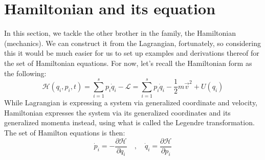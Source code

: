 \section{Hamiltonian and its equation}
In this section, we tackle the other brother in the family, the Hamiltonian (mechanics). We can construct it from the Lagrangian, fortunately, so considering this it would be much easier for us to set up examples and derivations thereof for the set of Hamiltonian equations. For now, let's recall the Hamiltonian form as the following: 
\begin{equation}
    \mathcal{H}(q_{i},p_{i},t) = \sum_{i=1}^{s}p_{i}\dot{q}_{i} - \mathcal{L} = \sum_{i=1}^{s}p_{i}\dot{q}_{i} - \frac{1}{2}m\vec{v}^{2} + U(q_{i})
\end{equation}
While Lagrangian is expressing a system via generalized coordinate and velocity, Hamiltonian expresses the system via its generalized coordinates and its generalized momenta instead, using what is called the Legendre transformation. The set of Hamilton equations is then: 
\begin{equation}
    \dot{p}_{i} = - \frac{\partial \mathcal{H}}{\partial q_{i}}\quad , \quad \dot{q}_{i} = \frac{\partial \mathcal{H}}{\partial p_{i}}
\end{equation}
